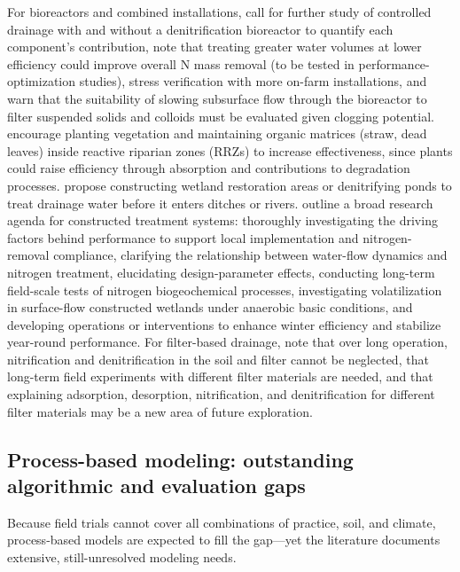 \documentclass[11pt]{article}
\begin{document}
For bioreactors and combined installations, \textcite{Husk2017} call for further study of controlled drainage with and without a denitrification bioreactor to quantify each component's contribution, note that treating greater water volumes at lower efficiency could improve overall N mass removal (to be tested in performance-optimization studies), stress verification with more on-farm installations, and warn that the suitability of slowing subsurface flow through the bioreactor to filter suspended solids and colloids must be evaluated given clogging potential. \textcite{Vallée2014} encourage planting vegetation and maintaining organic matrices (straw, dead leaves) inside reactive riparian zones (RRZs) to increase effectiveness, since plants could raise efficiency through absorption and contributions to degradation processes. \textcite{Randall2001} propose constructing wetland restoration areas or denitrifying ponds to treat drainage water before it enters ditches or rivers. \textcite{Mendes2021} outline a broad research agenda for constructed treatment systems: thoroughly investigating the driving factors behind performance to support local implementation and nitrogen-removal compliance, clarifying the relationship between water-flow dynamics and nitrogen treatment, elucidating design-parameter effects, conducting long-term field-scale tests of nitrogen biogeochemical processes, investigating volatilization in surface-flow constructed wetlands under anaerobic basic conditions, and developing operations or interventions to enhance winter efficiency and stabilize year-round performance. For filter-based drainage, \textcite{Tao2022} note that over long operation, nitrification and denitrification in the soil and filter cannot be neglected, that long-term field experiments with different filter materials are needed, and that explaining adsorption, desorption, nitrification, and denitrification for different filter materials may be a new area of future exploration.

\subsection{Process-based modeling: outstanding algorithmic and evaluation gaps}
Because field trials cannot cover all combinations of practice, soil, and climate, process-based models are expected to fill the gap---yet the literature documents extensive, still-unresolved modeling needs.
\end{document}
